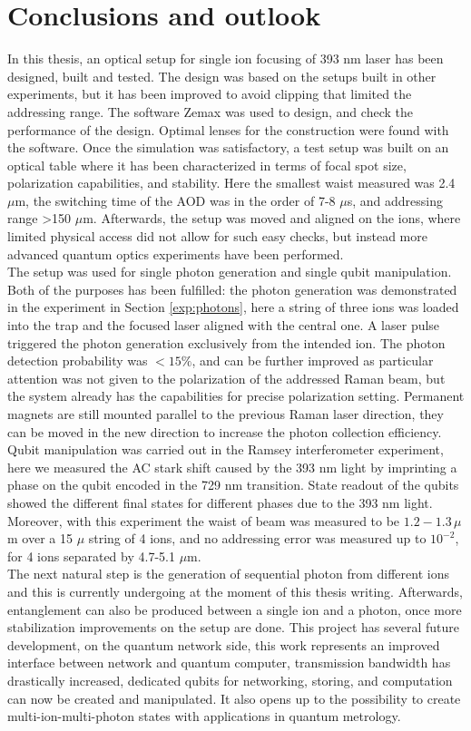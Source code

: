 
\chapter{Conclusions and outlook}
In this thesis, an optical setup for single ion focusing of 393 nm laser has been designed, built and tested. The design was based on the setups built in other experiments, but it has been improved to avoid clipping that limited the addressing range. The software Zemax was used to design, and check the performance of the design. Optimal lenses for the construction were found with the software. Once the simulation was satisfactory, a test setup was built on an optical table where it has been characterized in terms of focal spot size, polarization capabilities, and stability. Here the smallest waist measured was 2.4 $\mu$m, the switching time of the AOD was in the order of 7-8 $\mu$s, and addressing range >150 $\mu$m. Afterwards, the setup was moved and aligned on the ions, where limited physical access did not allow for such easy checks, but instead more advanced quantum optics experiments have been performed.\\
The setup was used for single photon generation and single qubit manipulation. Both of the purposes has been fulfilled: the photon generation was demonstrated in the experiment in Section \ref{exp:photons}, here a string of three ions was loaded into the trap and the focused laser aligned with the central one. A laser pulse triggered the photon generation exclusively from the intended ion. The photon detection probability was $<15\%$, and can be further improved as particular attention was not given to the polarization of the addressed Raman beam, but the system already has the capabilities for precise polarization setting. Permanent magnets are still mounted parallel to the previous Raman laser direction, they can be moved in the new direction to increase the photon collection efficiency.
 Qubit manipulation was carried out in the Ramsey interferometer experiment, here we measured the AC stark shift caused by the 393 nm light by imprinting a phase on the qubit encoded in the 729 nm transition. State readout of the qubits showed the different final states for different phases due to the 393 nm light. Moreover, with this experiment the waist of beam was measured to be $1.2-1.3\,\mu$m over a 15 $\mu$ string of 4 ions, and no addressing error was measured up to $10^{-2}$, for 4 ions separated by 4.7-5.1 $\mu$m.\\
The next natural step is the generation of sequential photon from different ions and this is currently undergoing at the moment of this thesis writing. Afterwards, entanglement can also be produced between a single ion and a photon, once more stabilization improvements on the setup are done. This project has several future development, on the quantum network side, this work represents an improved interface between network and quantum computer, transmission bandwidth has drastically increased, dedicated qubits for networking, storing, and computation can now be created and manipulated. It also opens up to the possibility to create multi-ion-multi-photon states with applications in quantum metrology.
